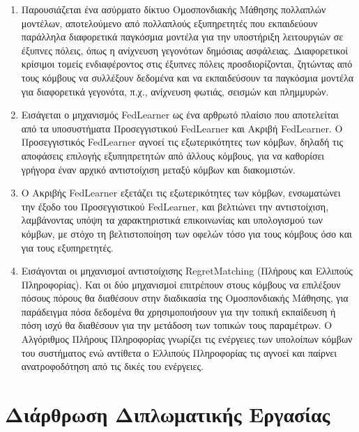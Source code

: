 \begin{enumerate}
    \item Παρουσιάζεται ένα ασύρματο δίκτυο Ομοσπονδιακής Μάθησης
     πολλαπλών μοντέλων, αποτελούμενο από πολλαπλούς εξυπηρετητές που εκπαιδεύουν παράλληλα διαφορετικά παγκόσμια μοντέλα για την υποστήριξη λειτουργιών σε έξυπνες πόλεις, όπως η ανίχνευση γεγονότων δημόσιας ασφάλειας. Διαφορετικοί κρίσιμοι τομείς ενδιαφέροντος στις έξυπνες πόλεις προσδιορίζονται, ζητώντας από τους κόμβους να συλλέξουν δεδομένα και να εκπαιδεύσουν τα παγκόσμια μοντέλα για διαφορετικά γεγονότα, π.χ., ανίχνευση φωτιάς, σεισμών και πλημμυρών.
    \item Εισάγεται ο μηχανισμός FedLearner ως ένα αρθρωτό πλαίσιο που αποτελείται από τα υποσυστήματα Προσεγγιστικού FedLearner και Ακριβή FedLearner. Ο Προσεγγιστικός FedLearner αγνοεί τις εξωτερικότητες των κόμβων, δηλαδή τις αποφάσεις επιλογής εξυπηπρετητών από άλλους κόμβους, για να καθορίσει γρήγορα έναν αρχικό αντιστοίχιση μεταξύ κόμβων και διακομιστών.
    \item Ο Ακριβής FedLearner εξετάζει τις εξωτερικότητες των κόμβων, ενσωματώνει την έξοδο του Προσεγγιστικού FedLearner, και βελτιώνει την αντιστοίχιση, λαμβάνοντας υπόψη τα χαρακτηριστικά επικοινωνίας και υπολογισμού των κόμβων, με στόχο τη βελτιστοποίηση των οφελών τόσο για τους κόμβους όσο και για τους εξυπηρετητές.
    \item Εισάγονται οι μηχανισμοί αντιστοίχισης RegretMatching (Πλήρους και Ελλιπούς Πληροφορίας). Και οι δύο μηχανισμοί επιτρέπουν στους κόμβους να επιλέξουν πόσους πόρους θα διαθέσουν στην διαδικασία της Ομοσπονδιακής Μάθησης, για παράδειγμα πόσα δεδομένα θα χρησιμοποιήσουν για την τοπική εκπαίδευση ή πόση ισχύ θα διαθέσουν για την μετάδοση των τοπικών τους παραμέτρων. Ο Αλγόριθμος Πλήρους Πληροφορίας γνωρίζει τις ενέργειες των υπολοίπων κόμβων του συστήματος ενώ αντίθετα ο Ελλιπούς Πληροφορίας τις αγνοεί και παίρνει ανατροφοδότηση από τις δικές του ενέργειες.
\end{enumerate}


\section{Διάρθρωση Διπλωματικής Εργασίας}

